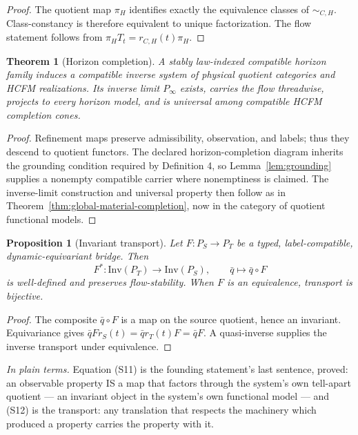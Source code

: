 \documentclass[11pt]{article}
\newtheorem{theorem}{Theorem}
\newtheorem{proposition}{Proposition}
\theoremstyle{definition}
\newcommand{\plainterms}{\emph{In plain terms.}}
\begin{document}
\begin{proof}
The quotient map $\pi_H$ identifies exactly the equivalence classes of $\sim_{C,H}$. Class-constancy is therefore equivalent to unique factorization. The flow statement follows from $\pi_H T_t = r_{C,H}(t)\pi_H$.
\end{proof}

\begin{theorem}[Horizon completion]
\label{thm:horizon-completion}
A stably law-indexed compatible horizon family induces a compatible inverse system of physical quotient categories and HCFM realizations. Its inverse limit $P_\infty$ exists, carries the flow threadwise, projects to every horizon model, and is universal among compatible HCFM completion cones.
\end{theorem}

\begin{proof}
Refinement maps preserve admissibility, observation, and labels; thus they descend to quotient functors. The declared horizon-completion diagram inherits the grounding condition required by Definition 4, so Lemma~\ref{lem:grounding} supplies a nonempty compatible carrier where nonemptiness is claimed. The inverse-limit construction and universal property then follow as in Theorem~\ref{thm:global-material-completion}, now in the category of quotient functional models.
\end{proof}

\begin{proposition}[Invariant transport]
Let $F : P_S \to P_T$ be a typed, label-compatible, dynamic-equivariant bridge. Then
\begin{equation}
F^{*} : \mathrm{Inv}(P_T) \to \mathrm{Inv}(P_S), \qquad \bar{q} \mapsto \bar{q} \circ F \tag{S12}
\end{equation}
is well-defined and preserves flow-stability. When $F$ is an equivalence, transport is bijective.
\end{proposition}

\begin{proof}
The composite $\bar{q} \circ F$ is a map on the source quotient, hence an invariant. Equivariance gives $\bar{q}F r_S(t) = \bar{q}r_T(t)F = \bar{q}F$. A quasi-inverse supplies the inverse transport under equivalence.
\end{proof}

\noindent\plainterms{} Equation (S11) is the founding statement's last sentence, proved: an observable property IS a map that factors through the system's own tell-apart quotient --- an invariant object in the system's own functional model --- and (S12) is the transport: any translation that respects the machinery which produced a property carries the property with it.
\end{document}
